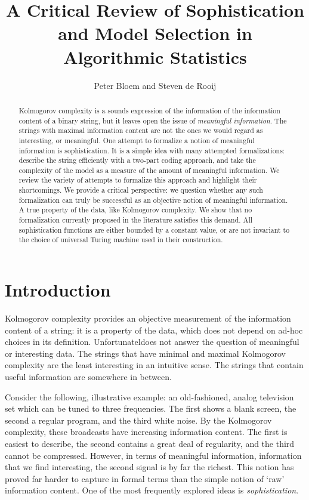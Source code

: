 \documentclass{style/llncs}
\title{A Critical Review of Sophistication and Model Selection in Algorithmic Statistics}
\author{Peter Bloem and Steven de Rooij}
\begin{document}
\maketitle

\begin{abstract}
\noindent Kolmogorov complexity is a sounds expression of the information of the information content of a binary string, but it leaves open the issue of \emph{meaningful information}. The strings with maximal information content are not the ones we would regard as interesting, or meaningful. 
One attempt to formalize a notion of meaningful information is sophistication. It is a simple idea with many attempted formalizations: describe the string efficiently with a two-part coding approach, and take the complexity of the model as a measure of the amount of meaningful information.
We review the variety of attempts to formalize this approach and highlight their shortcomings. We provide a critical perspective: we question whether any such formalization can truly be successful as an objective notion of meaningful information. A true property of the data, like Kolmogorov complexity. We show that no formalization currently proposed in the literature satisfies this demand. All sophistication functions are either bounded by a constant value, or are not invariant to the choice of universal Turing machine used in their construction.
\end{abstract}
\section{Introduction}

\noindent Kolmogorov complexity provides an objective measurement of the information content of a string: it is a property of the data, which does not depend on ad-hoc choices in its definition. Unfortunateldoes not answer the question of meaningful or interesting data. The strings that have minimal and maximal Kolmogorov complexity are the least interesting in an intuitive sense. The strings that contain useful information are somewhere in between.

Consider the following, illustrative example: an old-fashioned, analog television set which can be tuned to three frequencies. The first shows a blank screen, the second a regular program, and the third white noise. By the Kolmogorov complexity, these  broadcasts have increasing information content. The first is easiest to describe, the second contains a great deal of regularity, and the third cannot be compressed. However, in terms of meaningful information, information that we find interesting, the second signal is by far the richest. This notion has proved far harder to capture in formal terms than the simple notion of `raw' information content. One of the most frequently explored ideas is \emph{sophistication}.
\end{document}
